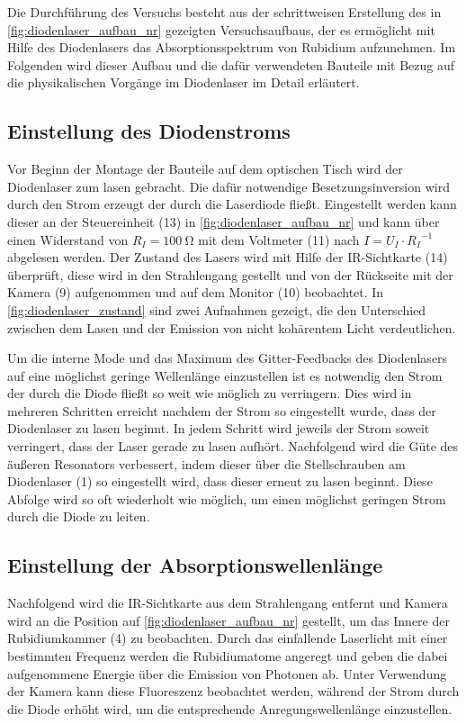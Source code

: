 
Die Durchführung des Versuchs besteht aus der schrittweisen Erstellung des in \cref{fig:diodenlaser_aufbau_nr}
gezeigten Versuchsaufbaus, der es ermöglicht mit Hilfe des Diodenlasers das Absorptionsspektrum
von Rubidium aufzunehmen. Im Folgenden wird dieser Aufbau und die dafür verwendeten Bauteile 
mit Bezug auf die physikalischen Vorgänge im Diodenlaser im Detail erläutert.



\subsection{Einstellung des Diodenstroms} \label{sec:einstellung_diodenstrom}
Vor Beginn der Montage der Bauteile auf dem optischen Tisch wird der Diodenlaser zum lasen gebracht.
Die dafür notwendige Besetzungsinversion wird durch den Strom erzeugt der durch die Laserdiode 
fließt. Eingestellt werden kann dieser an der Steuereinheit (13) in \cref{fig:diodenlaser_aufbau_nr} und
kann über einen Widerstand von $R_{I} = \SI{100}{\ohm}$ mit dem Voltmeter (11) nach
$I = U_{I} \cdot {R_{I}}^{-1}$ abgelesen werden. 
Der Zustand des Lasers wird mit Hilfe der IR-Sichtkarte (14) überprüft, diese wird in den Strahlengang 
gestellt und von der Rückseite mit der Kamera (9) aufgenommen und auf dem Monitor (10) beobachtet.
In \cref{fig:diodenlaser_zustand} sind zwei Aufnahmen gezeigt, die den Unterschied zwischen dem Lasen und der 
Emission von nicht kohärentem Licht verdeutlichen.



Um die interne Mode und das Maximum des Gitter-Feedbacks des Diodenlasers auf eine möglichst 
geringe Wellenlänge einzustellen ist es notwendig den Strom der durch die Diode fließt so weit 
wie möglich zu verringern.
Dies wird in mehreren Schritten erreicht nachdem der Strom so eingestellt wurde, dass 
der Diodenlaser zu lasen beginnt. In jedem Schritt wird jeweils der Strom soweit verringert,
dass der Laser gerade zu lasen aufhört. Nachfolgend wird die Güte des äußeren Resonators verbessert,
indem dieser über die Stellschrauben am Diodenlaser (1) so eingestellt wird, dass dieser erneut zu lasen beginnt. Diese Abfolge wird
so oft wiederholt wie möglich, um einen möglichst geringen Strom durch die Diode zu leiten. 

\subsection{Einstellung der Absorptionswellenlänge}
Nachfolgend wird die IR-Sichtkarte aus dem Strahlengang entfernt und Kamera wird an die 
Position auf \cref{fig:diodenlaser_aufbau_nr} gestellt, um das Innere der Rubidiumkammer (4)
zu beobachten. Durch das einfallende Laserlicht mit einer bestimmten Frequenz werden 
die Rubidiumatome angeregt und geben die dabei aufgenommene Energie über die Emission von
Photonen ab. Unter Verwendung der Kamera kann diese Fluoreszenz beobachtet werden, während
der Strom durch die Diode erhöht wird, um die entsprechende Anregungswellenlänge einzustellen.


